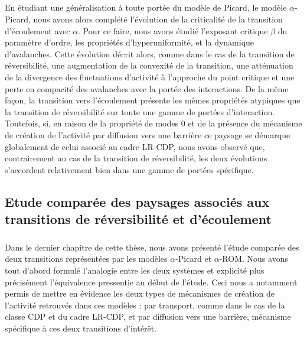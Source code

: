 \subparagraph{}En étudiant une généralisation à toute portée du modèle de Picard, le modèle $\alpha$-Picard, nous avons alors complété l'évolution de la criticalité de la transition d'écoulement avec $\alpha$. Pour ce faire, nous avons étudié l'exposant critique $\beta$ du paramètre d'ordre, les propriétés d'hyperuniformité, et la dynamique d'avalanches. Cette évolution décrit alors, comme dans le cas de la transition de réversibilité, une augmentation de la convexité de la transition, une atténuation de la divergence des fluctuations d'activité à l'approche du point critique et une perte en compacité des avalanches avec la portée des interactions. De la même façon, la transition vers l'écoulement présente les mêmes propriétés atypiques que la transition de réversibilité sur toute une gamme de portées d'interaction.  Toutefois, si, en raison de la propriété de modes 0 et de la présence du mécanisme de création de l'activité par diffusion vers une barrière ce paysage se démarque globalement de celui associé au cadre LR-CDP, nous avons observé que, contrairement au cas de la transition de réversibilité, les deux évolutions s'accordent relativement bien dans une gamme de portées spécifique.

\subsection*{Etude comparée des paysages associés aux transitions de réversibilité et d'écoulement}

\subparagraph{}Dans le dernier chapitre de cette thèse, nous avons présenté l'étude comparée des deux transitions représentées par les modèles $\alpha$-Picard et $\alpha$-ROM. Nous avons tout d'abord formulé l'analogie entre les deux systèmes et explicité plus précisément l'équivalence pressentie au début de l'étude. Ceci nous a notamment permis de mettre en évidence les deux types de mécanismes de création de l'activité retrouvés dans ces modèles : par transport, comme dans le cas de la classe CDP et du cadre LR-CDP, et par diffusion vers une barrière, mécanisme spécifique à ces deux transitions d'intérêt.

